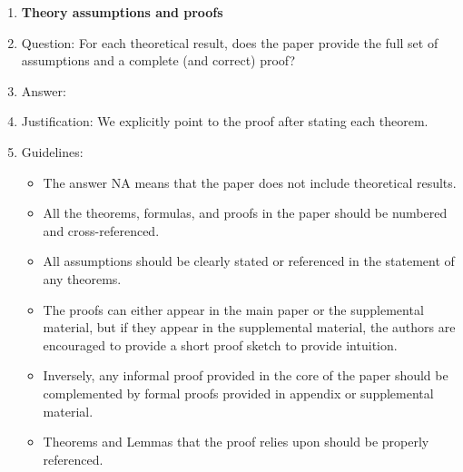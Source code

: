 \documentclass{article}
\begin{document}
{\begin{enumerate}
\item {\bf Theory assumptions and proofs}
    \item[] Question: For each theoretical result, does the paper provide the full set of assumptions and a complete (and correct) proof?
    \item[] Answer: \answerYes{} %
    \item[] Justification: We explicitly point to the proof after stating each theorem.
    \item[] Guidelines:
    \begin{itemize}
        \item The answer NA means that the paper does not include theoretical results. 
        \item All the theorems, formulas, and proofs in the paper should be numbered and cross-referenced.
        \item All assumptions should be clearly stated or referenced in the statement of any theorems.
        \item The proofs can either appear in the main paper or the supplemental material, but if they appear in the supplemental material, the authors are encouraged to provide a short proof sketch to provide intuition. 
        \item Inversely, any informal proof provided in the core of the paper should be complemented by formal proofs provided in appendix or supplemental material.
        \item Theorems and Lemmas that the proof relies upon should be properly referenced. 
    \end{itemize}


\end{enumerate}}
\end{document}
